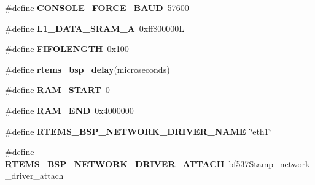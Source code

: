 \begin{DoxyCompactItemize}
$$\#define {\bfseries C\+O\+N\+S\+O\+L\+E\+\_\+\+F\+O\+R\+C\+E\+\_\+\+B\+A\+UD}~57600
\item 
\mbox{\label{group__RTEMSBSPsBfinBF537Stamp_ga79efc08b037a52ce2c37deba0f227370}} 
\#define {\bfseries L1\+\_\+\+D\+A\+T\+A\+\_\+\+S\+R\+A\+M\+\_\+A}~0xff800000L
\item 
\mbox{\label{group__RTEMSBSPsBfinBF537Stamp_gacd637fee3c03f7c3835388959b1d54f4}} 
\#define {\bfseries F\+I\+F\+O\+L\+E\+N\+G\+TH}~0x100
\item 
\#define {\bfseries rtems\+\_\+bsp\+\_\+delay}(microseconds)
\item 
\mbox{\label{group__RTEMSBSPsBfinBF537Stamp_ga2fb476d2a94e0e54f1125306010164a1}} 
\#define {\bfseries R\+A\+M\+\_\+\+S\+T\+A\+RT}~0
\item 
\mbox{\label{group__RTEMSBSPsBfinBF537Stamp_gacedc86555cbe508b02ba7cae729e64b1}} 
\#define {\bfseries R\+A\+M\+\_\+\+E\+ND}~0x4000000
\item 
\mbox{\label{group__RTEMSBSPsBfinBF537Stamp_ga86d4f9aa98431100692e31068070a8df}} 
\#define {\bfseries R\+T\+E\+M\+S\+\_\+\+B\+S\+P\+\_\+\+N\+E\+T\+W\+O\+R\+K\+\_\+\+D\+R\+I\+V\+E\+R\+\_\+\+N\+A\+ME}~\char`\"{}eth1\char`\"{}
\item 
\mbox{\label{group__RTEMSBSPsBfinBF537Stamp_gadde0d66aef9442971dde465292ac14e6}} 
\#define {\bfseries R\+T\+E\+M\+S\+\_\+\+B\+S\+P\+\_\+\+N\+E\+T\+W\+O\+R\+K\+\_\+\+D\+R\+I\+V\+E\+R\+\_\+\+A\+T\+T\+A\+CH}~bf537\+Stamp\+\_\+network\+\_\+driver\+\_\+attach
\end{DoxyCompactItemize}
